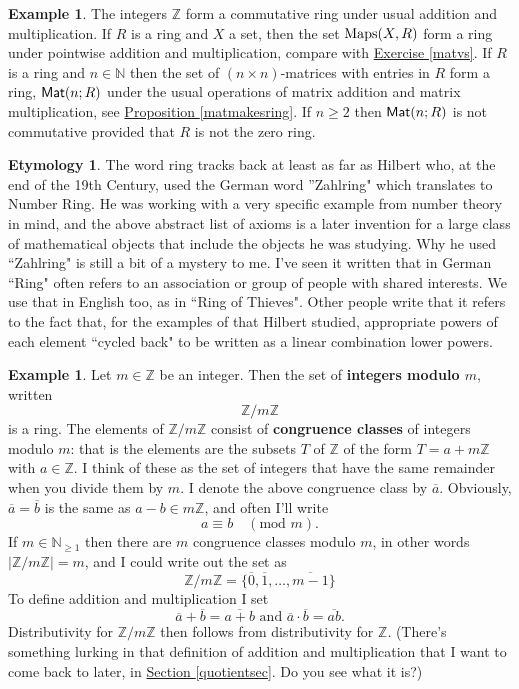 \documentclass[11pt]{amsbook}
\theoremstyle{definition}
\newtheorem{ex}[theorem]{Example}
\newtheorem*{etym}{Etymology}
\begin{document}
\begin{ex} The integers $\mathbb{Z}$ form a commutative ring under usual addition and multiplication. If $R$ is a ring and $X$ a set, then the set ${\rm Maps}(X,R)$ form a ring under pointwise addition and multiplication, compare with \hyperref[matvs]{Exercise \ref{matvs}}. If $R$ is a ring and $n\in \mathbb{N}$ then the set of $(n\times n)$-matrices with entries in $R$ form a ring, ${\sf Mat}(n; R)$ under the usual operations of matrix addition and matrix multiplication, see \hyperref[matmakesring]{Proposition \ref{matmakesring}}. If $n\geqslant 2$ then ${\sf Mat}(n;R)$ is not commutative provided that $R$ is not the zero ring.
\end{ex}

\begin{etym}
The word ring tracks back at least as far as Hilbert who, at the end of the 19th Century, used the German word ''Zahlring" which translates to Number Ring. He was working with a very specific example from number theory in mind, and the above abstract list of axioms is a later invention for a large class of mathematical objects that include the objects he was studying. Why he used ``Zahlring" is still a bit of a mystery to me. I've seen it written that in German ``Ring" often refers to an association or group of people with shared interests. We use that in English too, as in ``Ring of Thieves". Other people write that it refers to the fact that, for the examples of that Hilbert studied, appropriate powers of each element ``cycled back" to be written as a linear combination lower powers.
\end{etym}

\begin{ex}
\label{congmodm}
Let $m\in \mathbb{Z}$ be an integer. Then the set of {\bf integers modulo $m$}, written $$\mathbb{Z}/m\mathbb{Z}$$ is a ring. The elements of $\mathbb{Z}/m\mathbb{Z}$ consist of {\bf congruence classes} of integers modulo $m$: that is the elements are the subsets $T$ of $\mathbb{Z}$ of the form $T = a + m\mathbb{Z}$ with $a\in \mathbb{Z}$. I think of these as the set of integers that have the same remainder when you divide them by $m$. I denote the above congruence class by $\overline{a}$. Obviously, $\overline{a} = \overline{b}$ is the same as $a - b\in m \mathbb{Z}$, and often I'll write $$a\equiv b \quad (\text{mod }m).$$ If $m \in \mathbb{N}_{\geqslant 1}$ then there are $m$ congruence classes modulo $m$, in other words $|\mathbb{Z}/m\mathbb{Z}| = m$, and I could write out the set as $$\mathbb{Z}/m\mathbb{Z} = \{ \overline{0}, \overline{1}, \ldots , \overline{m-1} \}$$ To define addition and multiplication I set $$\overline{a} + \overline{b} = \overline{a+b}\text{ and } \overline{a}\cdot \overline{b} = \overline{ab}.$$ Distributivity for $\mathbb{Z}/m\mathbb{Z}$ then follows from distributivity for $\mathbb{Z}$. (There's something lurking in that definition of addition and multiplication that I want to come back to later, in \hyperref[quotientsec]{Section \ref{quotientsec}}. Do you see what it is?)
\end{ex}
\end{document}

